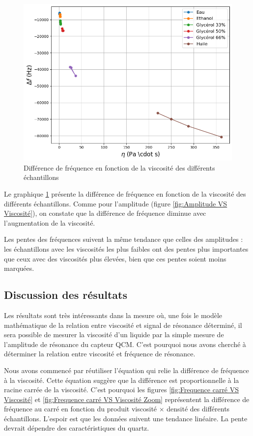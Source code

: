 \begin{figure}[H]
    \centering
    \includegraphics[width=\textwidth]{assets/figures/frequency-viscosity.png}
    \caption{Différence de fréquence en fonction de la viscosité des différents échantillons}
    \label{fig:Frequence VS Viscosité}
\end{figure}

Le graphique \ref{fig:Frequence VS Viscosité} présente la différence de fréquence en fonction de la viscosité des différents échantillons.  
Comme pour l'amplitude (figure \ref{fig:Amplitude VS Viscosité}), on constate que la différence de fréquence diminue avec l'augmentation de la viscosité.

Les pentes des fréquences suivent la même tendance que celles des amplitudes : les échantillons avec les viscosités les plus faibles ont des pentes plus importantes que ceux avec des viscosités plus élevées, bien que ces pentes soient moins marquées.

\subsection{Discussion des résultats}

Les résultats sont très intéressants dans la mesure où, une fois le modèle mathématique de la relation entre viscosité et signal de résonance déterminé, il sera possible de mesurer la viscosité d’un liquide par la simple mesure de l’amplitude de résonance du capteur QCM.  
C’est pourquoi nous avons cherché à déterminer la relation entre viscosité et fréquence de résonance.

Nous avons commencé par réutiliser l’équation \cite{eq:frequence_resonance} qui relie la différence de fréquence à la viscosité.  
Cette équation suggère que la différence est proportionnelle à la racine carrée de la viscosité.  
C’est pourquoi les figures \ref{fig:Frequence carré VS Viscosité} et \ref{fig:Frequence carré VS Viscosité Zoom} représentent la différence de fréquence au carré en fonction du produit viscosité $\times$ densité des différents échantillons.  
L'espoir est que les données suivent une tendance linéaire. La pente devrait dépendre des caractéristiques du quartz.

